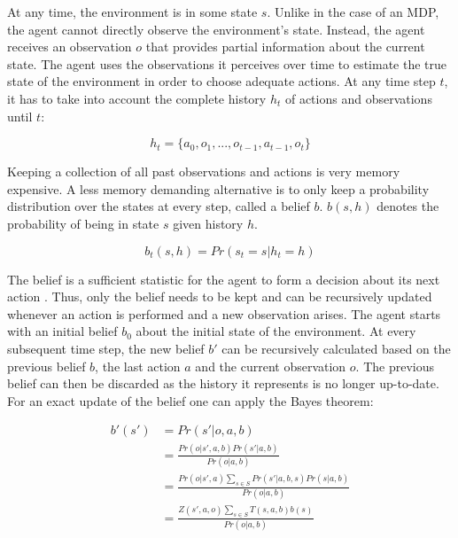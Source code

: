 At any time, the environment is in some state $s$. Unlike in the case of an MDP, the agent cannot directly observe the environment's state. Instead, the agent receives an observation $o$ that provides partial information about the current state. The agent uses the observations it perceives over time to estimate the true state of the environment in order to choose adequate actions. At any time step $t$, it has to take into account the complete history $h_t$ of actions and observations until $t$:

\begin{equation}
    h_t = \{a_0,o_1,...,o_{t-1},a_{t-1},o_t\}
\end{equation}

Keeping a collection of all past observations and actions is very memory expensive. A less memory demanding alternative is to only keep a probability distribution over the states at every step, called a belief $b$. $b(s,h)$ denotes the probability of being in state $s$ given history $h$. 

\begin{equation}
    b_t(s,h) = Pr(s_t = s|h_t = h)
\end{equation}

The belief is a sufficient statistic for the agent to form a decision about its next action \parencite{pomdp-belief}. Thus, only the belief needs to be kept and can be recursively updated whenever an action is performed and a new observation arises. The agent starts with an initial belief $b_0$ about the initial state of the environment. At every subsequent time step, the new belief $b'$ can be recursively calculated based on the previous belief $b$, the last action $a$ and the current observation $o$. The previous belief can then be discarded as the history it represents is no longer up-to-date. For an exact update of the belief one can apply the Bayes theorem:

\begin{equation}
    \label{eq:bayes_update}
    \begin{split}
        b'(s') & = Pr(s' | o, a , b) \\
               & = \frac{Pr(o | s', a, b)Pr(s' | a,b)}{Pr(o| a, b)} \\
               & = \frac{Pr(o | s', a)\sum_{s \in S}Pr(s' | a, b, s)Pr(s| a, b)}{Pr(o| a, b)} \\
               & = \frac{Z(s', a, o)\sum_{s \in S}T(s, a, b)b(s)}{Pr(o | a, b)}
    \end{split}
\end{equation}

